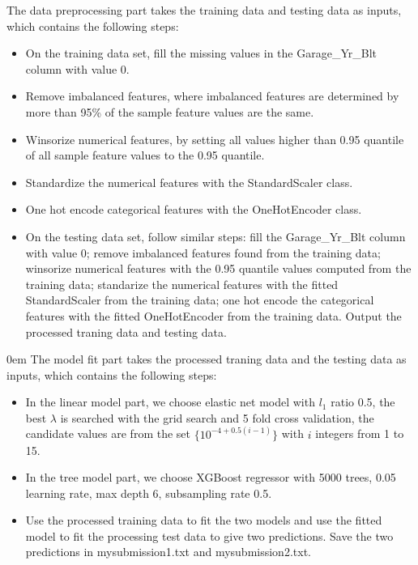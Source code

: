 \documentclass[12pt]{article}
\theoremstyle{plain}
\begin{document}
The data preprocessing part takes the training data and testing data as inputs, which contains the following steps:
\begin{itemize}
\itemsep0em
\item On the training data set, fill the missing values in the Garage\_Yr\_Blt column with value 0.
\item Remove imbalanced features, where imbalanced features are determined by more than 95\% of the sample feature values are the same.
\item Winsorize numerical features, by setting all values higher than 0.95 quantile of all sample feature values to the 0.95 quantile.
\item Standardize the numerical features with the StandardScaler class.
\item One hot encode categorical features with the OneHotEncoder class.
\item On the testing data set, follow similar steps: fill the Garage\_Yr\_Blt column with value 0; remove imbalanced features found from the training data; winsorize numerical features with the 0.95 quantile values computed from the training data; standarize the numerical features with the fitted StandardScaler from the training data; one hot encode the categorical features with the fitted OneHotEncoder from the training data. Output the processed traning data and testing data.
\end{itemize}
\itemsep0em
The model fit part takes the processed traning data and the testing data as inputs, which contains the following steps:
\begin{itemize}
\item In the linear model part, we choose elastic net model with $l_1$ ratio 0.5, the best $\lambda$ is searched with the grid search and 5 fold cross validation, the candidate values are from the set $\lbrace 10^{-4+0.5(i-1)}\rbrace$ with $i$ integers from 1 to 15.
\item In the tree model part, we choose XGBoost regressor with 5000 trees, 0.05 learning rate, max depth 6, subsampling rate 0.5. 
\item Use the processed training data to fit the two models and use the fitted model to fit the processing test data to give two predictions. Save the two predictions in mysubmission1.txt and mysubmission2.txt.
\end{itemize} 
\end{document}
